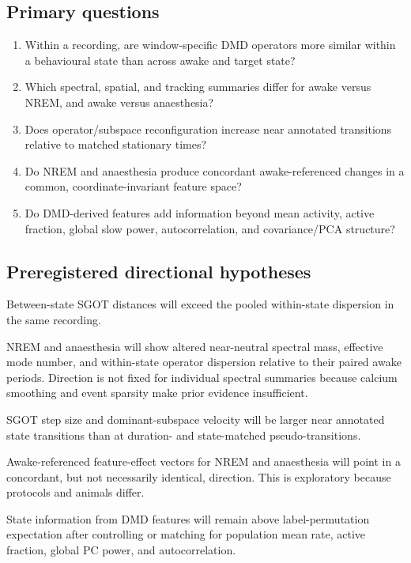 \documentclass[11pt,a4paper]{article}
\begin{document}
\subsection{Primary questions}

\begin{enumerate}
  \item Within a recording, are window-specific DMD operators more similar within a behavioural state than across awake and target state?
  \item Which spectral, spatial, and tracking summaries differ for awake versus NREM, and awake versus anaesthesia?
  \item Does operator/subspace reconfiguration increase near annotated transitions relative to matched stationary times?
  \item Do NREM and anaesthesia produce concordant awake-referenced changes in a common, coordinate-invariant feature space?
  \item Do DMD-derived features add information beyond mean activity, active fraction, global slow power, autocorrelation, and covariance/PCA structure?
\end{enumerate}

\subsection{Preregistered directional hypotheses}

\begin{description}[style=nextline,leftmargin=1.5em]
  \item[H1 --- operator separation.] Between-state SGOT distances will exceed the pooled within-state dispersion in the same recording.
  \item[H2 --- dynamical repertoire.] NREM and anaesthesia will show altered near-neutral spectral mass, effective mode number, and within-state operator dispersion relative to their paired awake periods. Direction is not fixed for individual spectral summaries because calcium smoothing and event sparsity make prior evidence insufficient.
  \item[H3 --- transition reconfiguration.] SGOT step size and dominant-subspace velocity will be larger near annotated state transitions than at duration- and state-matched pseudo-transitions.
  \item[H4 --- partial commonality.] Awake-referenced feature-effect vectors for NREM and anaesthesia will point in a concordant, but not necessarily identical, direction. This is exploratory because protocols and animals differ.
  \item[H5 --- incremental dynamics.] State information from DMD features will remain above label-permutation expectation after controlling or matching for population mean rate, active fraction, global PC power, and autocorrelation.
\end{description}
\end{document}
